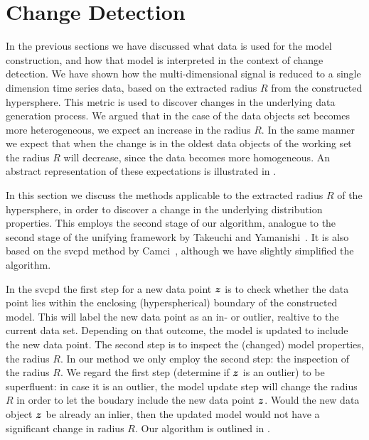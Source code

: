 \section{Change Detection}\label{sec:method_change_detection}
In the previous sections we have discussed what data is used for the model construction, and how that model is interpreted in the context of change detection.
We have shown how the multi-dimensional signal is reduced to a single dimension time series data, based on the extracted radius $R$ from the constructed hypersphere.
This metric is used to discover changes in the underlying data generation process.
We argued that in the case of the data objects set becomes more heterogeneous, we expect an increase in the radius $R$.
In the same manner we expect that when the change is in the oldest data objects of the working set the radius $R$ will decrease, since the data becomes more homogeneous.
An abstract representation of these expectations is illustrated in .

In this section we discuss the methods applicable to the extracted radius $R$ of the hypersphere, in order to discover a change in the underlying distribution properties.
This employs the second stage of our algorithm, analogue to the second stage of the unifying framework by Takeuchi and Yamanishi~\cite{takeuchi2006unifying}.
It is also based on the \gls{svcpd} method by Camci~\cite{camci2010change}, although we have slightly simplified the algorithm.

In the \gls{svcpd} the first step for a new data point $\vectorsym{z}$ is to check whether the data point lies within the enclosing (hyperspherical) boundary of the constructed model.
This will label the new data point as an in- or outlier, realtive to the current data set.
Depending on that outcome, the model is updated to include the new data point.
The second step is to inspect the (changed) model properties, \ie the radius $R$.
In our method we only employ the second step: the inspection of the radius $R$.
We regard the first step (determine if $\vectorsym{z}$ is an outlier) to be superfluent: in case it is an outlier, the model update step will change the radius $R$ in order to let the boudary include the new data point $\vectorsym{z}$.
Would the new data object $\vectorsym{z}$ be already an inlier, then the updated model would not have a significant change in radius $R$.
Our algorithm is outlined in .

